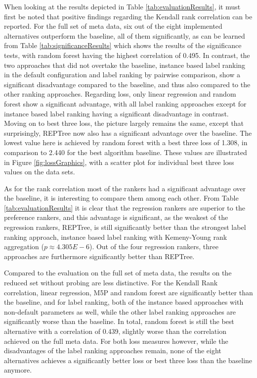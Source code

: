 When looking at the results depicted in Table \ref{tab:evaluationResults}, it must first be noted that positive findings regarding the Kendall rank correlation can be reported. For the full set of meta data, six out of the eight implemented alternatives outperform the baseline, all of them significantly, as can be learned from Table \ref{tab:significanceResults} which shows the results of the significance tests, with random forest having the highest correlation of 0.495. In contrast, the two approaches that did not overtake the baseline, instance based label ranking in the default configuration and label ranking by pairwise comparison, show a significant disadvantage compared to the baseline, and thus also compared to the other ranking approaches. Regarding loss, only linear regression and random forest show a significant advantage, with all label ranking approaches except for instance based label ranking having a significant disadvantage in contrast. Moving on to best three loss, the picture largely remains the same, except that surprisingly, REPTree now also has a significant advantage over the baseline. The lowest value here is achieved by random forest with a best three loss of 1.308, in comparison to 2.440 for the best algorithm baseline. These values are illustrated in Figure \ref{fig:lossGraphics}, with a scatter plot for individual best three loss values on the data sets.

As for the rank correlation most of the rankers had a significant advantage over the baseline, it is interesting to compare them among each other. From Table \ref{tab:evaluationResults} it is clear that the regression rankers are superior to the preference rankers, and this advantage is significant, as the weakest of the regression rankers, REPTree, is still significantly better than the strongest label ranking approach, instance based label ranking with Kemeny-Young rank aggregation ($p \approx 4.305E-6$). Out of the four regression rankers, three approaches are furthermore significantly better than REPTree. 

Compared to the evaluation on the full set of meta data, the results on the reduced set without probing are less distinctive. For the Kendall Rank correlation, linear regression, M5P and random forest are significantly better than the baseline, and for label ranking, both of the instance based approaches with non-default parameters as well, while the other label ranking approaches are significantly worse than the baseline. In total, random forest is still the best alternative with a correlation of 0.439, slightly worse than the correlation achieved on the full meta data. For both loss measures however, while the disadvantages of the label ranking approaches remain, none of the eight alternatives achieves a significantly better loss or best three loss than the baseline anymore.

